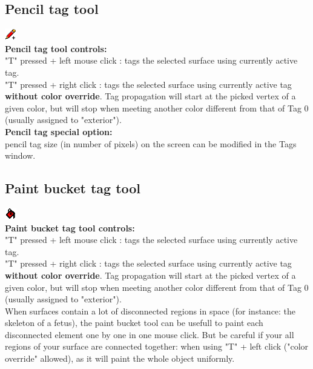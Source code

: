 \subsection{Pencil tag tool}
\includegraphics[scale=0.7]{images/12/pencil.png}\\
\textbf{Pencil tag tool controls:}\\
"T" pressed + left mouse click : tags the selected surface using currently active tag.\\
"T" pressed + right click : tags the selected surface using currently active tag \textbf{without color override}. Tag propagation will start at the picked vertex of a given color, but will stop when meeting another color different from that of Tag 0 (usually assigned to "exterior").\\

\textbf{Pencil tag special option:}\\
\noindent
pencil tag size (in number of pixels) on the screen can be modified in the Tags window.



\subsection{Paint bucket tag tool}
\includegraphics[scale=0.7]{images/12/paint_bucket.png}\\
\textbf{Paint bucket tag tool controls:}\\
"T" pressed + left mouse click : tags the selected surface using currently active tag.\\
"T" pressed + right click : tags the selected surface using currently active tag \textbf{without color override}. Tag propagation will start at the picked vertex of a given color, but will stop when meeting another color different from that of Tag 0 (usually assigned to "exterior").\\
 
When surfaces contain a lot of disconnected regions in space (for instance: the skeleton of a fetus), the paint bucket tool can be usefull to paint each disconnected element one by one in one mouse click. But be careful if your all regions of your surface are connected together: when using "T" + left click ("color override" allowed), as it will paint the whole object uniformly.

